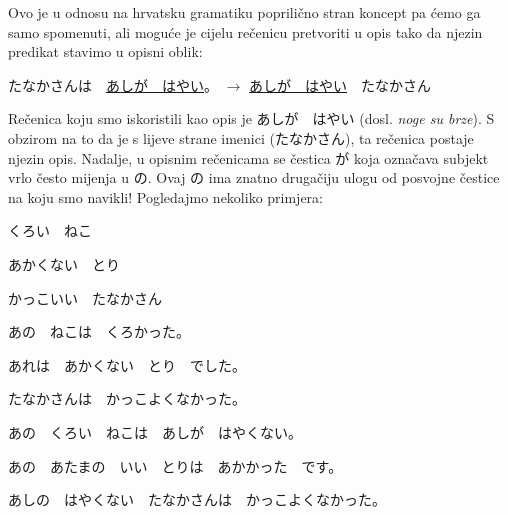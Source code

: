 	
	Ovo je u odnosu na hrvatsku gramatiku poprilično stran koncept pa ćemo ga samo spomenuti, ali moguće je cijelu rečenicu pretvoriti u opis tako da njezin predikat stavimo u opisni oblik:
	
	\vspace{10pt}
	たなかさんは　\underline{あしが　はやい}。 $\rightarrow$ \underline{あしが　はやい}　たなかさん
	
	\vspace{10pt}\noindent
	Rečenica koju smo iskoristili kao opis je あしが　はやい (dosl. \textit{noge su brze}). S obzirom na to da je s lijeve strane imenici (たなかさん), ta rečenica postaje njezin opis. Nadalje, u opisnim rečenicama se čestica が koja označava subjekt vrlo često mijenja u の. Ovaj の ima znatno drugačiju ulogu od posvojne čestice na koju smo navikli! Pogledajmo nekoliko primjera:
	
	\begin{reibun}
	\end{reibun}

	
	\vspace{-30pt}
	\begin{mondai}{}
		\item くろい　ねこ
		\item あかくない　とり
		\item かっこいい　たなかさん
		\vspace{5pt}
		\item あの　ねこは　くろかった。
		\item あれは　あかくない　とり　でした。
		\item たなかさんは　かっこよくなかった。
		\vspace{5pt}
		\item あの　くろい　ねこは　あしが　はやくない。
		\item あの　あたまの　いい　とりは　あかかった　です。
		\item あしの　はやくない　たなかさんは　かっこよくなかった。
	\end{mondai}

	
\newpage
{}

